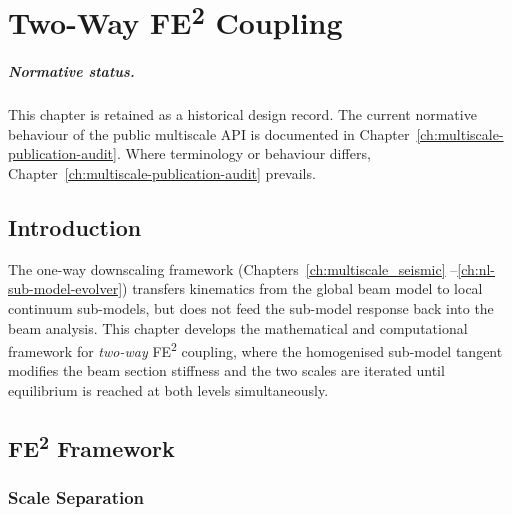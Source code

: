 
\chapter{Two-Way FE\textsuperscript{2} Coupling}
\label{ch:two-way-fe2}

\paragraph{Normative status.}
This chapter is retained as a historical design record.  The current normative
behaviour of the public multiscale API is documented in
Chapter~\ref{ch:multiscale-publication-audit}.  Where terminology or behaviour
differs, Chapter~\ref{ch:multiscale-publication-audit} prevails.


\section{Introduction}
\label{sec:fe2-intro}

The one-way downscaling framework (Chapters~\ref{ch:multiscale_seismic}
--\ref{ch:nl-sub-model-evolver}) transfers kinematics from the global
beam model to local continuum sub-models, but does not feed the sub-model
response back into the beam analysis.  This chapter develops the
mathematical and computational framework for \emph{two-way}
FE\textsuperscript{2} coupling, where the homogenised sub-model tangent
modifies the beam section stiffness and the two scales are iterated until
equilibrium is reached at both levels simultaneously.


\section{FE\textsuperscript{2} Framework}
\label{sec:fe2-framework}

\subsection{Scale Separation}

